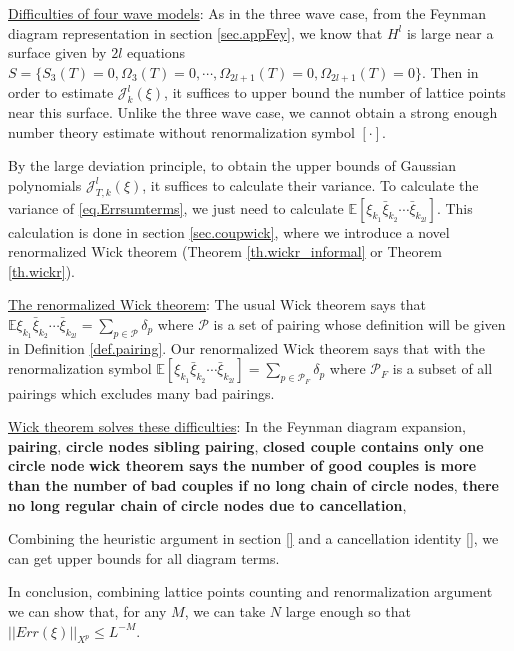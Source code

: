 \underline{Difficulties of four wave models}: As in the three wave case, from the Feynman diagram representation in section \ref{sec.appFey}, we know that $H^l$ is large near a surface given by $2l$ equations $S=\{S_{3}(T)=0,\Omega_{3}(T)=0,\cdots,\Omega_{2l+1}(T)=0,\Omega_{2l+1}(T)=0\}$. Then in order to estimate $\mathcal{J}_k^l(\xi)$, it suffices to upper bound the number of lattice points near this surface. Unlike the three wave case, we cannot obtain a strong enough number theory estimate without renormalization symbol $[\cdot]$.



By the large deviation principle, to obtain the upper bounds of Gaussian polynomials $\mathcal{J}_{T,k}^l(\xi)$, it suffices to calculate their variance. To calculate the variance of \eqref{eq.Errsumterms}, we just need to calculate $\mathbb{E}[\xi_{k_1}\bar{\xi}_{k_2}\cdots\bar{\xi}_{k_{2l}}]$. This calculation is done in section \ref{sec.coupwick}, where we introduce a novel renormalized Wick theorem (Theorem \ref{th.wickr_informal} or Theorem \ref{th.wickr}).

\underline{The renormalized Wick theorem}: The usual Wick theorem says that $\mathbb{E}\xi_{k_1}\bar{\xi}_{k_2}\cdots\bar{\xi}_{k_{2l}}=\sum_{p\in \mathcal{P}}\delta_p$ where $\mathcal{P}$ is a set of pairing whose definition will be given in Definition \ref{def.pairing}. Our renormalized Wick theorem says that with the renormalization symbol $\mathbb{E}[\xi_{k_1}\bar{\xi}_{k_2}\cdots\bar{\xi}_{k_{2l}}]=\sum_{p\in \mathcal{P}_F}\delta_p$ where $\mathcal{P}_F$ is a subset of all pairings which excludes many bad pairings.

\underline{Wick theorem solves these difficulties}: In the Feynman diagram expansion, \textbf{pairing}, \textbf{circle nodes sibling pairing}, \textbf{closed couple contains only one circle node} \textbf{wick theorem says the number of good couples is more than the number of bad couples if no long chain of circle nodes}, \textbf{there no long regular chain of circle nodes due to cancellation}, 


Combining the heuristic argument in section \ref{} and a cancellation identity \eqref{}, we can get upper bounds for all diagram terms.

In conclusion, combining lattice points counting and renormalization argument we can show that, for any $M$, we can take $N$ large enough so that $||Err(\xi)||_{X^p}\le L^{-M}$.





